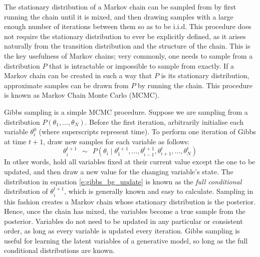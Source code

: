 The stationary distribution of a Markov chain can be sampled from by first running the chain until it is mixed, and then drawing samples with a large enough number of iterations between them so as to be i.i.d. This procedure does not require the stationary distribution to ever be explicitly defined, as it arises naturally from the transition distribution and the structure of the chain. This is the key usefulness of Markov chains; very commonly, one needs to sample from a distribution $P$ that is intractable or impossible to sample from exactly. If a Markov chain can be created in such a way that $P$ is its stationary distribution, approximate samples can be drawn from $P$ by running the chain. This procedure is known as Markov Chain Monte Carlo (MCMC).

Gibbs sampling \cite{mackay2003information} is a simple MCMC procedure. Suppose we are sampling from a distribution $P(\theta_1, \ldots, \theta_N)$. Before the first iteration, arbitrarily initialise each variable $\theta_i^0$ (where superscripts represent time). To perform one iteration of Gibbs at time $t+1$, draw new samples for each variable as follows: \begin{equation}
  \theta_i^{t+1}\ \ \sim\ \ P(\theta_i \mid \theta_1^{t+1}, \ldots, \theta_{i-1}^{t+1}, \theta_{i+1}^t, \ldots, \theta_N^t) \label{e:gibbs_bg_update}
\end{equation}
In other words, hold all variables fixed at their current value except the one to be updated, and then draw a new value for the changing variable's state. The distribution in equation \ref{e:gibbs_bg_update} is known as the \emph{full conditional} distribution of $\theta_i^{t+1}$, which is generally known and easy to calculate. Sampling in this fashion creates a Markov chain whose stationary distribution is the posterior. Hence, once the chain has mixed, the variables become a true sample from the posterior. Variables do not need to be updated in any particular or consistent order, as long as every variable is updated every iteration. Gibbs sampling is useful for learning the latent variables of a generative model, so long as the full conditional distributions are known.

